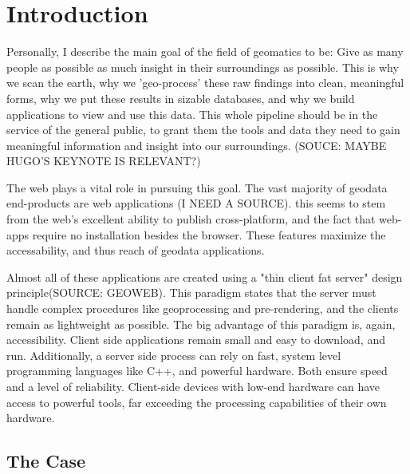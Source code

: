 \newpage
\section{Introduction}

Personally, I describe the main goal of the field of geomatics to be: Give as many people as possible as much insight in their surroundings as possible.
This is why we scan the earth, why we 'geo-process' these raw findings into clean, meaningful forms, why we put these results in sizable databases, and why we build applications to view and use this data.
This whole pipeline should be in the service of the general public, to grant them the tools and data they need to gain meaningful information and insight into our surroundings. (SOUCE: MAYBE HUGO'S KEYNOTE IS RELEVANT?)


The web plays a vital role in pursuing this goal. The vast majority of geodata end-products are web applications (I NEED A SOURCE). this seems to stem from the web's excellent ability to publish cross-platform, and the fact that web-apps require no installation besides the browser. These features maximize the accessability, and thus reach of geodata applications.

Almost all of these applications are created using a "thin client fat server" design principle(SOURCE: GEOWEB). 
This paradigm states that the server must handle complex procedures like geoprocessing and pre-rendering, and the clients remain as lightweight as possible. 
The big advantage of this paradigm is, again, accessibility. 
Client side applications remain small and easy to download,  and run. 
Additionally, a server side process can rely on fast, system level programming languages like C++, and powerful hardware. Both ensure speed and a level of reliability.  Client-side devices with low-end hardware can have access to powerful tools, far exceeding the processing capabilities of their own hardware. 

\subsection*{The Case}

